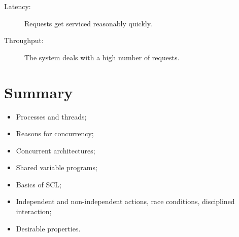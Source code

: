 \bigskip


\begin{description}
\item[Latency:]
Requests get serviced reasonably quickly.

\item[Throughput:]
The system deals with a high number of requests.
\end{description}



\section{Summary}

\begin{itemize}
\item
Processes and threads;

\item
Reasons for concurrency;

\item
Concurrent architectures;

\item
Shared variable programs; 

\item
Basics of SCL;

\item
Independent and non-independent actions, race conditions, disciplined
interaction; 

\item
Desirable properties.
\end{itemize}


\exercises








